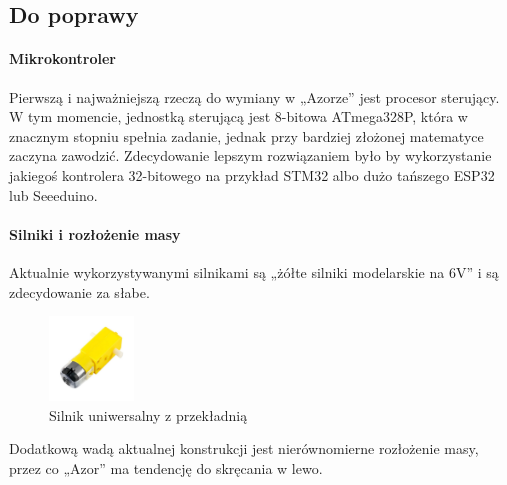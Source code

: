     \newpage
    \subsection{Do poprawy}
        \paragraph{Mikrokontroler\\}
        Pierwszą i najważniejszą rzeczą do wymiany w „Azorze” jest procesor sterujący.
        W tym momencie, jednostką sterującą jest 8-bitowa ATmega328P, która w znacznym stopniu spełnia zadanie, jednak przy bardziej złożonej matematyce zaczyna zawodzić.
        Zdecydowanie lepszym rozwiązaniem było by wykorzystanie jakiegoś kontrolera 32-bitowego na przykład STM32 albo dużo tańszego ESP32 lub Seeeduino.

        \paragraph{Silniki i rozłożenie masy\\}
        Aktualnie wykorzystywanymi silnikami są „żółte silniki modelarskie na 6V” i są zdecydowanie za słabe.
        \begin{figure}[!h]
            \centering
            \includegraphics[width = 0.2\textwidth]{Img/silnik.jpg}
            \caption{Silnik uniwersalny z przekładnią}
        \end{figure}
        
        Dodatkową wadą aktualnej konstrukcji jest nierównomierne rozłożenie masy, przez co „Azor” ma tendencję do skręcania w lewo.